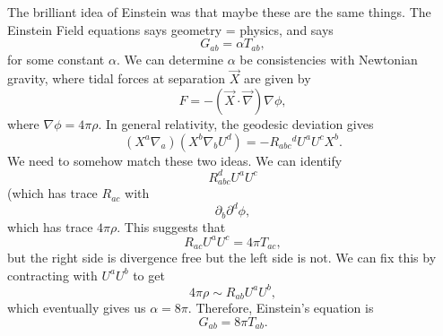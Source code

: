 \documentclass{article}
\numberwithin{equation}{section}
\begin{document}
The brilliant idea of Einstein was that maybe these are the same things. The Einstein Field equations says geometry = physics, and says 
\begin{equation*}
    G_{ab} = \alpha T_{ab},
\end{equation*}
for some constant $\alpha.$ We can determine $\alpha$ be consistencies with Newtonian gravity, where tidal forces at separation $\vec{X}$ are given by 
\begin{equation*}
    F = -\left(\vec{X} \cdot \vec{\nabla}\right) \nabla\phi,
\end{equation*}
where $\nabla\phi = 4\pi \rho.$ In general relativity, the geodesic deviation gives 
\begin{equation*}
    (X^a\nabla_a)(X^b\nabla_b U^d) = -R_{abc}{}^dU^aU^cX^b.
\end{equation*}
We need to somehow match these two ideas. We can identify 
\begin{equation*}
    R_{abc}^dU^aU^c
\end{equation*}
(which has trace $R_{ac}$ with 
\begin{equation*}
    \partial_b\partial^d \phi,
\end{equation*}
which has trace $4\pi \rho.$ This suggests that 
\begin{equation*}
    R_{ac}U^aU^c = 4\pi T_{ac},
\end{equation*}
but the right side is divergence free but the left side is not. We can fix this by contracting with $U^aU^b$ to get 
\begin{equation*}
    4\pi \rho \sim R_{ab}U^aU^b,
\end{equation*}
which eventually gives us $\alpha = 8\pi.$ Therefore, Einstein's equation is 
\begin{equation*}
    G_{ab} = 8\pi T_{ab}.
\end{equation*}
\end{document}
